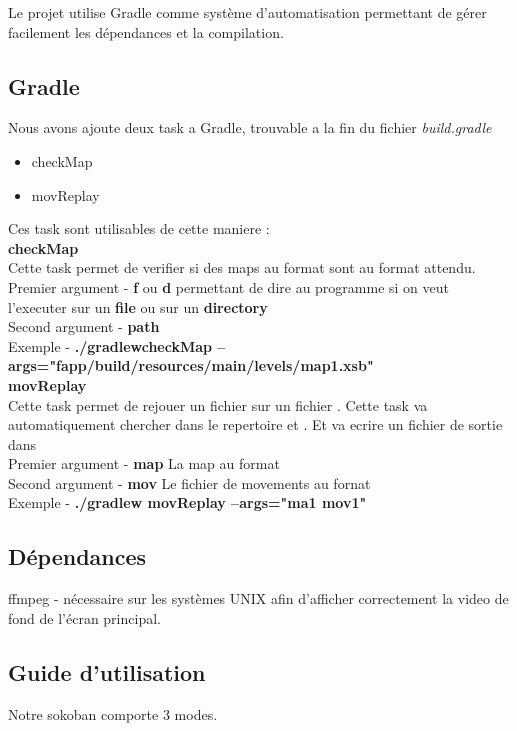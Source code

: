 \documentclass[../main.tex]{subfiles}
\begin{document}
Le projet utilise Gradle comme système d'automatisation permettant de gérer facilement les dépendances et la compilation.
\subsection{Gradle}
Nous avons ajoute deux task a Gradle, trouvable a la fin du fichier \textit{build.gradle}
\begin{itemize}
    \item checkMap
    \item movReplay
\end{itemize}
Ces task sont utilisables de cette maniere : \\

\textbf{checkMap} \\
Cette task permet de verifier si des maps au format  sont au format attendu. \\
Premier argument - \textbf{f} ou \textbf{d} permettant de dire au programme si on veut l'executer sur un \textbf{file} ou sur un \textbf{directory} \\
Second argument - \textbf{path} \\
Exemple - \textbf{./gradlewcheckMap --args="fapp/build/resources/main/levels/map1.xsb"} \\

\textbf{movReplay} \\
Cette task permet de rejouer un fichier  sur un fichier . Cette task va automatiquement chercher dans le repertoire 
et . Et va ecrire un fichier de sortie dans  \\
Premier argument - \textbf{map} La map au format  \\
Second argument - \textbf{mov} Le fichier de movements au fornat  \\
Exemple - \textbf{./gradlew movReplay --args="ma1 mov1"}

\subsection{Dépendances}
ffmpeg - nécessaire sur les systèmes UNIX afin d'afficher correctement la video de fond de l'écran principal.
\subsection{Guide d'utilisation}
Notre sokoban comporte 3 modes. \\
\end{document}
